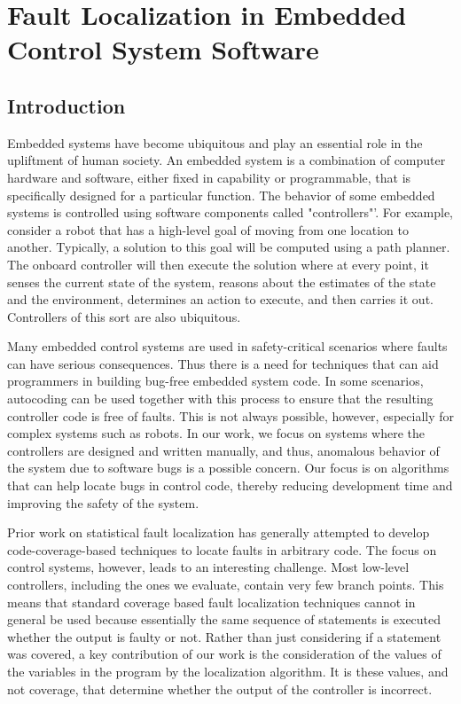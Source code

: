 \chapter{Fault Localization in Embedded Control System Software}\label{robot}

\section{Introduction}

Embedded systems have become ubiquitous and play an essential role in the upliftment of
human society. An embedded system is a combination of computer hardware and software,
either fixed in capability or programmable, that is specifically designed for a particular function. The behavior of some embedded systems is controlled using software components called "controllers"'. For example, consider a robot that has a high-level goal of moving from one
location to another. Typically, a solution to this goal will be computed using a path planner.
The onboard controller will then execute the solution where at every point, it senses the current
state of the system, reasons about the estimates of the state and the environment, determines an
action to execute, and then carries it out. Controllers of this sort are also ubiquitous.

Many embedded control systems are used in safety-critical
scenarios where faults can have serious consequences. Thus
there is a need for techniques that can aid programmers in
building bug-free embedded system code. In some scenarios, autocoding \cite{whalen1999approach} can
be used together with this process to ensure that the resulting
controller code is free of faults. This is not always possible,
however, especially for complex systems such as robots. In our
work, we focus on systems where the controllers are designed
and written manually, and thus, anomalous behavior of the
system due to software bugs is a possible concern. Our focus
is on algorithms that can help locate bugs in control code,
thereby reducing development time and improving the safety
of the system.

Prior work on statistical fault localization has generally
attempted to develop code-coverage-based techniques to locate
faults in arbitrary code. The focus on control systems, however, leads to an
interesting challenge. Most low-level controllers, including the
ones we evaluate, contain very few branch points. This means that standard coverage
based fault localization techniques cannot in general be
used because essentially the same sequence of statements is
executed whether the output is faulty or not. Rather than just
considering if a statement was covered, a key contribution of
our work is the consideration of the values of the variables in
the program by the localization algorithm. It is these values,
and not coverage, that determine whether the output of the
controller is incorrect.

